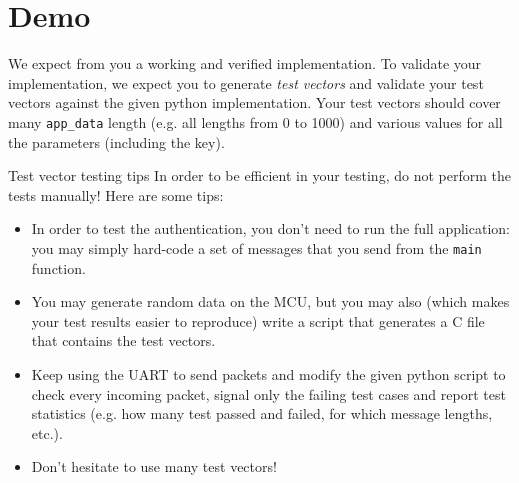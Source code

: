 
\section{Demo}

We expect from you a working and verified implementation.
To validate your implementation, we expect you to generate \emph{test vectors}
and validate your test vectors against the given python implementation.
Your test vectors should cover many \texttt{app\_data} length (e.g. all lengths
from 0 to 1000) and various values for all the parameters (including the key).

\begin{bclogo}[couleur = gray!20, arrondi = 0.2, logo=\bcinfo]{Test vector testing tips}
In order to be efficient in your testing, do not perform the tests manually! Here are some tips:
\begin{itemize}
    \item In order to test the authentication, you don't need to run the full
        application: you may simply hard-code a set of messages that you send
        from the \texttt{main} function.
    \item You may generate random data on the MCU, but you may also (which
        makes your test results easier to reproduce) write a script that
        generates a C file that contains the test vectors.
    \item Keep using the UART to send packets and modify the given python
        script to check every incoming packet, signal only the failing test
        cases and report test statistics (e.g. how many test passed and failed,
        for which message lengths, etc.).
    \item Don't hesitate to use many test vectors!
\end{itemize}
\end{bclogo}
